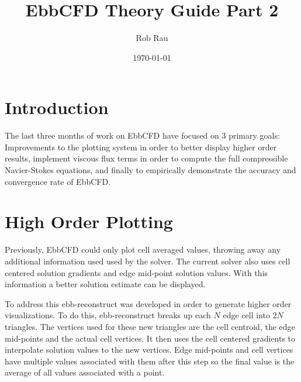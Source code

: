 \documentclass[12pt,parskip=full]{article}
\numberwithin{subsection}{section}
\begin{document}
	\vspace{-4ex}
	\title{EbbCFD Theory Guide Part 2\vspace{-3.5ex}}
	\author{Rob Rau\vspace{-4ex}}
	\date{\today\vspace{-4ex}}
	\maketitle

	\section{Introduction}
		The last three months of work on EbbCFD have focused on 3 primary goals: Improvements to the plotting system in order to
		better display higher order results, implement viscous flux terms in order to compute the full compressible Navier-Stokes 
		equations, and finally to empirically demonstrate the accuracy and convergence rate of EbbCFD.

	\section{High Order Plotting}
		Previously, EbbCFD could only plot cell averaged values, throwing away any additional information used used by the solver.
		The current solver also uses cell centered solution gradients and edge mid-point solution values. With this information
		a better solution estimate can be displayed.
		
		To address this ebb-reconstruct was developed in order to generate higher order visualizations. To do this, ebb-reconstruct
		breaks up each $N$ edge cell into $2N$ triangles. The vertices used for these new triangles are the cell centroid, the edge
		mid-points and the actual cell vertices. It then uses the cell centered gradients to interpolate solution values to the new
		vertices. Edge mid-points and cell vertices have multiple values associated with them after this step so the final value is
		the average of all values associated with a point.
\end{document}
